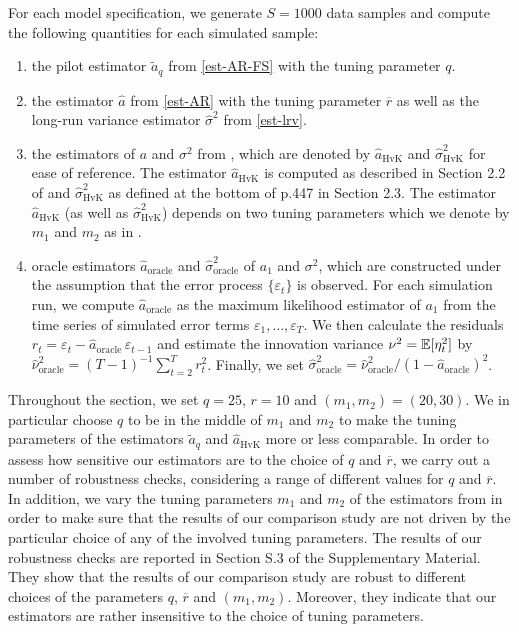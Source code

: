 For each model specification, we generate $S=1000$ data samples and compute the following quantities for each simulated sample: 
\begin{enumerate}[label=(\roman*),leftmargin=0.9cm]
\item the pilot estimator $\widetilde{a}_q$ from \eqref{est-AR-FS} with the tuning parameter $q$.
\item the estimator $\widehat{a}$ from \eqref{est-AR} with the tuning parameter $\overline{r}$ as well as the long-run variance estimator $\widehat{\sigma}^2$ from \eqref{est-lrv}. 
\item the estimators of $a$ and $\sigma^2$ from \cite{Hall2003}, which are denoted by $\widehat{a}_{\text{HvK}}$ and $\widehat{\sigma}^2_{\text{HvK}}$ for ease of reference. The estimator $\widehat{a}_{\text{HvK}}$ is computed as described in Section 2.2 of \cite{Hall2003} and $\widehat{\sigma}^2_{\text{HvK}}$ as defined at the bottom of p.447 in Section 2.3. The estimator $\widehat{a}_{\text{HvK}}$ (as well as $\widehat{\sigma}^2_{\text{HvK}}$) depends on two tuning parameters which we denote by $m_1$ and $m_2$ as in \cite{Hall2003}. 
\item oracle estimators $\widehat{a}_{\text{oracle}}$ and $\widehat{\sigma}^2_{\text{oracle}}$ of $a_1$ and $\sigma^2$, which are constructed under the assumption that the error process $\{\varepsilon_t\}$ is observed. For each simulation run, we compute $\widehat{a}_{\text{oracle}}$ as the maximum likelihood estimator of $a_1$ from the time series of simulated error terms $\varepsilon_1,\ldots,\varepsilon_T$. We then calculate the residuals $r_t = \varepsilon_t - \widehat{a}_{\text{oracle}} \, \varepsilon_{t-1}$ and estimate the innovation variance $\nu^2 = \mathbb{E}[\eta_t^2]$ by $\widehat{\nu}_{\text{oracle}}^2 = (T-1)^{-1} \sum_{t=2}^T r_t^2$. Finally, we set $\widehat{\sigma}^2_{\text{oracle}} = \widehat{\nu}_{\text{oracle}}^2 / (1 - \widehat{a}_{\text{oracle}})^2$. 
\end{enumerate}
Throughout the section, we set $q = 25$, $r = 10$ and $(m_1,m_2) = (20,30)$. We in particular choose $q$ to be in the middle of $m_1$ and $m_2$ to make the tuning parameters of the estimators $\widetilde{a}_q$ and $\widehat{a}_{\text{HvK}}$ more or less comparable. In order to assess how sensitive our estimators are to the choice of $q$ and $\overline{r}$, we carry out a number of robustness checks, considering a range of different values for $q$ and $\overline{r}$. In addition, we vary the tuning parameters $m_1$ and $m_2$ of the estimators from \cite{Hall2003} in order to make sure that the results of our comparison study are not driven by the particular choice of any of the involved tuning parameters. The results of our robustness checks are reported in Section S.3 of the Supplementary Material. They show that the results of our comparison study are robust to %
different choices of the parameters $q$, $\overline{r}$ and $(m_1,m_2)$. Moreover, they indicate that our estimators are rather insensitive to the choice of tuning parameters. 



